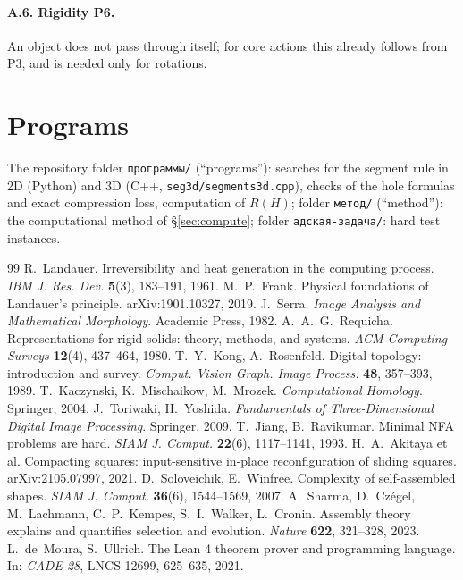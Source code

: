 \documentclass[11pt,a4paper]{article}
\theoremstyle{plain}
\theoremstyle{definition}
\theoremstyle{remark}
\begin{document}
\paragraph{A.6. Rigidity P6.} An object does not pass through itself; for core actions this already follows from P3, and is needed only for rotations.

\section{Programs}
The repository folder \texttt{программы/} (``programs''): searches for the segment rule in 2D (Python) and 3D (C++, \texttt{seg3d/segments3d.cpp}), checks of the hole formulas and exact compression loss, computation of $R(H)$; folder \texttt{метод/} (``method''): the computational method of §\ref{sec:compute}; folder \texttt{адская-задача/}: hard test instances.

\begin{thebibliography}{99}
 R.~Landauer. Irreversibility and heat generation in the computing process. \emph{IBM J. Res. Dev.} \textbf{5}(3), 183--191, 1961.
 M.~P.~Frank. Physical foundations of Landauer's principle. arXiv:1901.10327, 2019.
 J.~Serra. \emph{Image Analysis and Mathematical Morphology}. Academic Press, 1982.
 A.~A.~G.~Requicha. Representations for rigid solids: theory, methods, and systems. \emph{ACM Computing Surveys} \textbf{12}(4), 437--464, 1980.
 T.~Y.~Kong, A.~Rosenfeld. Digital topology: introduction and survey. \emph{Comput. Vision Graph. Image Process.} \textbf{48}, 357--393, 1989.
 T.~Kaczynski, K.~Mischaikow, M.~Mrozek. \emph{Computational Homology}. Springer, 2004.
 J.~Toriwaki, H.~Yoshida. \emph{Fundamentals of Three-Dimensional Digital Image Processing}. Springer, 2009.
 T.~Jiang, B.~Ravikumar. Minimal NFA problems are hard. \emph{SIAM J. Comput.} \textbf{22}(6), 1117--1141, 1993.
 H.~A.~Akitaya et al. Compacting squares: input-sensitive in-place reconfiguration of sliding squares. arXiv:2105.07997, 2021.
 D.~Soloveichik, E.~Winfree. Complexity of self-assembled shapes. \emph{SIAM J. Comput.} \textbf{36}(6), 1544--1569, 2007.
 A.~Sharma, D.~Czégel, M.~Lachmann, C.~P.~Kempes, S.~I.~Walker, L.~Cronin. Assembly theory explains and quantifies selection and evolution. \emph{Nature} \textbf{622}, 321--328, 2023.
 L.~de~Moura, S.~Ullrich. The Lean 4 theorem prover and programming language. In: \emph{CADE-28}, LNCS 12699, 625--635, 2021.
\end{thebibliography}
\end{document}
